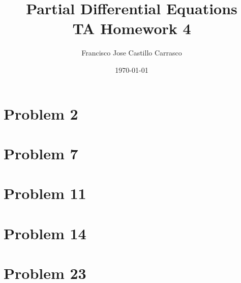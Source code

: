 




\title{Partial Differential Equations\\TA Homework 4}
\author{Francisco Jose Castillo Carrasco}
\date{\today}
\maketitle




\section*{Problem 2}

\newpage
\section*{Problem 7}

\newpage
\section*{Problem 11}


\section*{Problem 14}


\section*{Problem 23}




